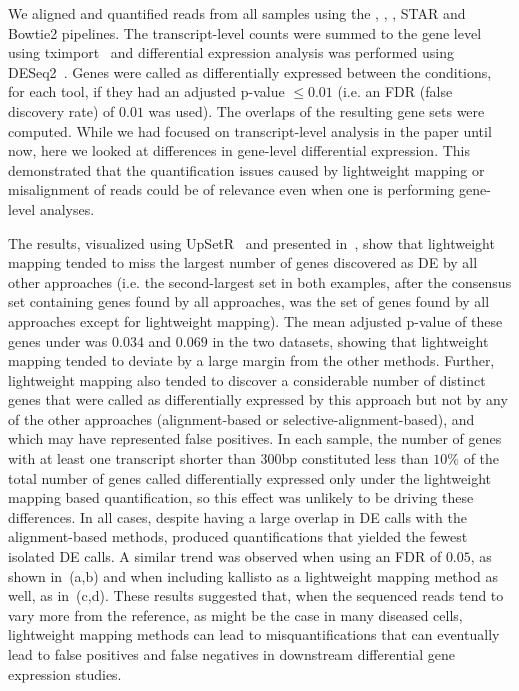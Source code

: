We aligned and quantified reads from all samples using the \hsa, \saf, \qm, STAR and
Bowtie2 pipelines. The transcript-level counts were summed to the gene level
using tximport~\citep{soneson2015differential} and differential expression analysis was
performed using DESeq2~\citep{love2014moderated}. Genes were called as
differentially expressed between the conditions, for each tool, if they had an adjusted p-value
$\leq 0.01$ (i.e. an FDR (false discovery rate) of $0.01$ was used).  The overlaps of the
resulting gene sets were computed. While we had focused on transcript-level
analysis in the paper until now, here we looked at differences in gene-level
differential expression. This demonstrated that the quantification issues caused
by lightweight mapping or misalignment of reads could be of relevance even when
one is performing gene-level analyses.

The results, visualized using UpSetR~\cite{conway2017upsetr} and presented
  in~, show that lightweight mapping tended to miss the largest number 
  of genes discovered as DE by all other approaches (i.e. the second-largest set in 
  both examples, after the consensus set containing genes found by all approaches, was
  the set of genes found by all approaches except for lightweight mapping). The mean
  adjusted p-value of these genes under \qm was $0.034$ and $0.069$ in the two datasets,
  showing that lightweight mapping tended to deviate by a large margin from the other methods. Further,
  lightweight mapping also tended to discover a considerable number of distinct genes 
  that were called as differentially expressed by this approach but not by any of the other approaches
  (alignment-based or selective-alignment-based), and which may have represented false positives.
  In each sample, the number of genes with at least one transcript shorter than
  $300$bp constituted less than $10\%$ of the total number of genes called
  differentially expressed only under the lightweight mapping based
  quantification, so this effect was unlikely to be driving these differences.
  In all cases, despite having a large overlap
  in DE calls with the alignment-based methods, \hsa produced quantifications that yielded
  the fewest isolated DE calls. A similar trend was observed when using an FDR of $0.05$, as shown in~(a,b)
  and when including kallisto as a lightweight mapping method as well, as in~(c,d). 
  These results suggested that, when
  the sequenced reads tend to vary more from the reference, as might be the case
  in many diseased cells, lightweight mapping methods can lead to
  misquantifications that can eventually lead to false positives and false
  negatives in downstream differential gene expression studies.
 
